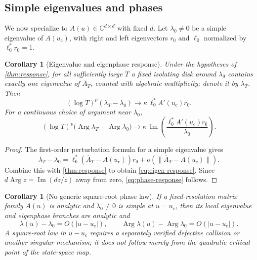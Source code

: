 \documentclass[11pt]{article}
\newtheorem{corollary}[theorem]{Corollary}
\theoremstyle{definition}
\theoremstyle{remark}
\newcommand{\C}{\mathbb C}
\newcommand{\uc}{u_{\mathrm c}}
\newcommand{\Arg}{\operatorname{Arg}}
\begin{document}
\subsection{Simple eigenvalues and phases}

We now specialize to $A(u)\in\C^{d\times d}$ with fixed $d$.  Let $\lambda_0\ne0$ be a simple eigenvalue of $A(\uc)$, with right and left eigenvectors $r_0$ and $\ell_0$ normalized by $\ell_0^*r_0=1$.

\begin{corollary}[Eigenvalue and eigenphase response]\label{cor:eigen-response}
Under the hypotheses of \cref{thm:response}, for all sufficiently large $T$ a fixed isolating disk around $\lambda_0$ contains exactly one eigenvalue of $\overline A_T$, counted with algebraic multiplicity; denote it by $\lambda_T$.  Then
\begin{equation}\label{eq:eigen-response}
    (\log T)^p(\lambda_T-\lambda_0)
    \longrightarrow
    \kappa\,\ell_0^*A'(\uc)r_0.
\end{equation}
For a continuous choice of argument near $\lambda_0$,
\begin{equation}\label{eq:phase-response}
    (\log T)^p\bigl(\Arg\lambda_T-\Arg\lambda_0\bigr)
    \longrightarrow
    \kappa\,\operatorname{Im}
    \left(\frac{\ell_0^*A'(\uc)r_0}{\lambda_0}\right).
\end{equation}
\end{corollary}

\begin{proof}
The first-order perturbation formula for a simple eigenvalue \citep{Kato1995} gives
\[
    \lambda_T-\lambda_0
    =\ell_0^*(\overline A_T-A(\uc))r_0
     +o(\|\overline A_T-A(\uc)\|).
\]
Combine this with \cref{thm:response} to obtain \eqref{eq:eigen-response}.  Since $d\Arg z=\operatorname{Im}(dz/z)$ away from zero, \eqref{eq:phase-response} follows.
\end{proof}

\begin{corollary}[No generic square-root phase law]\label{cor:no-square-root}
If a fixed-resolution matrix family $A(u)$ is analytic and $\lambda_0\ne0$ is simple at $u=\uc$, then its local eigenvalue and eigenphase branches are analytic and
\[
    \lambda(u)-\lambda_0=O(|u-\uc|),
    \qquad
    \Arg\lambda(u)-\Arg\lambda_0=O(|u-\uc|).
\]
A square-root law in $u-\uc$ requires a separately verified defective collision or another singular mechanism; it does not follow merely from the quadratic critical point of the state-space map.
\end{corollary}
\end{document}
